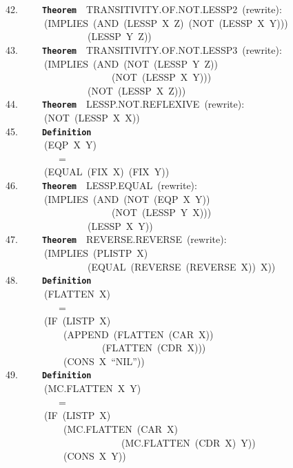 \documentclass[11pt]{book}
\newenvironment{pubasis}{\begin{flushleft}\ttfamily\small}{\normalsize\rmfamily\end{flushleft}}
\newcommand{\axiomordefinition}[1]{\vspace{6pt}\texttt{\textbf{#1}}}
\begin{document}
\begin{pubasis}
42.~~~~~\axiomordefinition{Theorem}~~TRANSITIVITY.OF.NOT.LESSP2~(rewrite):\\
~~~~~~~~(IMPLIES~(AND~(LESSP~X~Z)~(NOT~(LESSP~X~Y)))\\
~~~~~~~~~~~~~~~~~(LESSP~Y~Z))\\

43.~~~~~\axiomordefinition{Theorem}~~TRANSITIVITY.OF.NOT.LESSP3~(rewrite):\\
~~~~~~~~(IMPLIES~(AND~(NOT~(LESSP~Y~Z))\\
~~~~~~~~~~~~~~~~~~~~~~(NOT~(LESSP~X~Y)))\\
~~~~~~~~~~~~~~~~~(NOT~(LESSP~X~Z)))\\

44.~~~~~\axiomordefinition{Theorem}~~LESSP.NOT.REFLEXIVE~(rewrite):\\
~~~~~~~~(NOT~(LESSP~X~X))\\

45.~~~~~\axiomordefinition{Definition}\\
~~~~~~~~(EQP~X~Y)\\
~~~~~~~~~~~=\\
~~~~~~~~(EQUAL~(FIX~X)~(FIX~Y))\\

46.~~~~~\axiomordefinition{Theorem}~~LESSP.EQUAL~(rewrite):\\
~~~~~~~~(IMPLIES~(AND~(NOT~(EQP~X~Y))\\
~~~~~~~~~~~~~~~~~~~~~~(NOT~(LESSP~Y~X)))\\
~~~~~~~~~~~~~~~~~(LESSP~X~Y))\\

47.~~~~~\axiomordefinition{Theorem}~~REVERSE.REVERSE~(rewrite):\\
~~~~~~~~(IMPLIES~(PLISTP~X)\\
~~~~~~~~~~~~~~~~~(EQUAL~(REVERSE~(REVERSE~X))~X))\\

48.~~~~~\axiomordefinition{Definition}\\
~~~~~~~~(FLATTEN~X)\\
~~~~~~~~~~~=\\
~~~~~~~~(IF~(LISTP~X)\\
~~~~~~~~~~~~(APPEND~(FLATTEN~(CAR~X))\\
~~~~~~~~~~~~~~~~~~~~(FLATTEN~(CDR~X)))\\
~~~~~~~~~~~~(CONS~X~``NIL''))\\

49.~~~~~\axiomordefinition{Definition}\\
~~~~~~~~(MC.FLAT\-TEN~X~Y)\\
~~~~~~~~~~~=\\
~~~~~~~~(IF~(LISTP~X)\\
~~~~~~~~~~~~(MC.FLAT\-TEN~(CAR~X)\\
~~~~~~~~~~~~~~~~~~~~~~~~(MC.FLAT\-TEN~(CDR~X)~Y))\\
~~~~~~~~~~~~(CONS~X~Y))\\


\end{pubasis}
\end{document}
